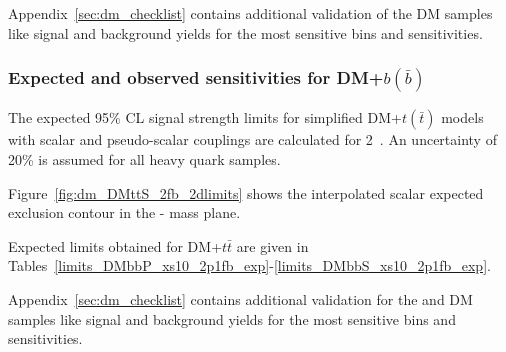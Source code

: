 Appendix~\ref{sec:dm_checklist} contains additional validation of the \DMj DM samples like signal and background yields for the most sensitive bins and sensitivities.

\subsubsection{Expected and observed sensitivities for DM+$b(\bar{b})$}

The expected 95\% CL signal strength limits for simplified DM+$t(\bar{t})$ models with scalar and
pseudo-scalar couplings are calculated for 2~\ifb. An uncertainty of 20\% is assumed for all 
heavy quark samples.


Figure~\ref{fig:dm_DMttS_2fb_2dlimits} shows the interpolated scalar expected 
exclusion contour in the {\mphi-\mchi} mass plane.


\clearpage
Expected limits obtained for DM+$t\bar{t}$ are given in Tables~\ref{limits_DMbbP_xs10_2p1fb_exp}-\ref{limits_DMbbS_xs10_2p1fb_exp}. 



%
%


Appendix~\ref{sec:dm_checklist} contains additional validation for the \DMtt and \DMtt DM samples like signal and background yields for the most sensitive bins and sensitivities.

